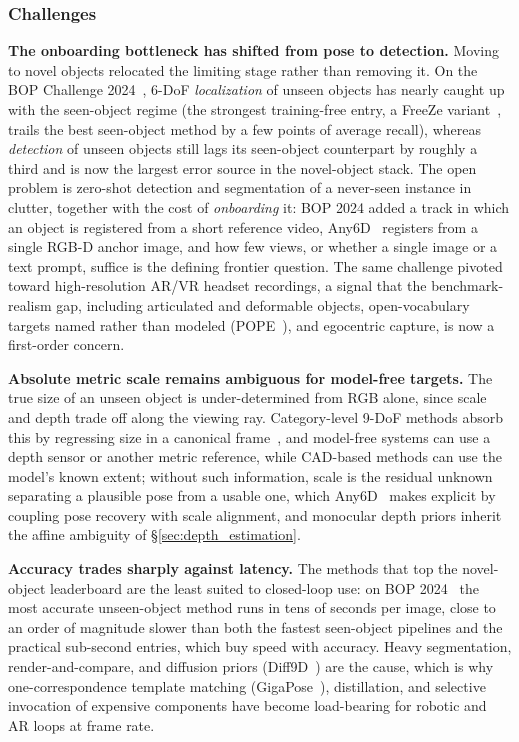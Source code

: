 \subsubsection{Challenges}

\textbf{The onboarding bottleneck has shifted from pose to detection.}
Moving to novel objects relocated the limiting stage rather than removing it.
On the BOP Challenge 2024~\cite{nguyen2024bopchallenge}, 6-DoF \emph{localization} of unseen objects has nearly caught up with the seen-object regime (the strongest training-free entry, a FreeZe variant~\cite{caraffa2024freeze}, trails the best seen-object method by a few points of average recall), whereas \emph{detection} of unseen objects still lags its seen-object counterpart by roughly a third and is now the largest error source in the novel-object stack.
The open problem is zero-shot detection and segmentation of a never-seen instance in clutter, together with the cost of \emph{onboarding} it: BOP 2024 added a track in which an object is registered from a short reference video, Any6D~\cite{lee2025any6d} registers from a single RGB-D anchor image, and how few views, or whether a single image or a text prompt, suffice is the defining frontier question. The same challenge pivoted toward high-resolution AR/VR headset recordings, a signal that the benchmark-realism gap, including articulated and deformable objects, open-vocabulary targets named rather than modeled (POPE~\cite{fan2023pope}), and egocentric capture, is now a first-order concern.

\textbf{Absolute metric scale remains ambiguous for model-free targets.}
The true size of an unseen object is under-determined from RGB alone, since scale and depth trade off along the viewing ray.
Category-level 9-DoF methods absorb this by regressing size in a canonical frame~\cite{Wang0HVSG19}, and model-free systems can use a depth sensor or another metric reference, while CAD-based methods can use the model's known extent; without such information, scale is the residual unknown separating a plausible pose from a usable one, which Any6D~\cite{lee2025any6d} makes explicit by coupling pose recovery with scale alignment, and monocular depth priors inherit the affine ambiguity of \S\ref{sec:depth_estimation}.

\textbf{Accuracy trades sharply against latency.}
The methods that top the novel-object leaderboard are the least suited to closed-loop use: on BOP 2024~\cite{nguyen2024bopchallenge} the most accurate unseen-object method runs in tens of seconds per image, close to an order of magnitude slower than both the fastest seen-object pipelines and the practical sub-second entries, which buy speed with accuracy.
Heavy segmentation, render-and-compare, and diffusion priors (Diff9D~\cite{liu2024diff9d}) are the cause, which is why one-correspondence template matching (GigaPose~\cite{nguyen2024gigapose}), distillation, and selective invocation of expensive components have become load-bearing for robotic and AR loops at frame rate.

